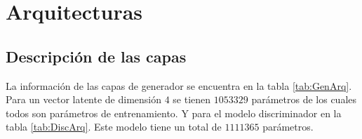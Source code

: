 
\chapter{Arquitecturas} %

\label{AppendixA} %

\section{Descripción de las capas}

La información de las capas de generador se encuentra en la tabla \ref{tab:GenArq}. Para un vector latente de dimensión $4$ se tienen $1053329$ parámetros de los cuales todos son parámetros de entrenamiento. Y para el modelo discriminador en la tabla \ref{tab:DiscArq}. Este modelo tiene un total de $1111365$ parámetros.


